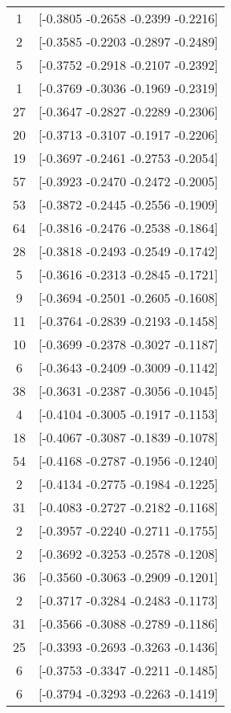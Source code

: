 \documentclass[12pt, fullpage,letterpaper]{article}
\begin{document}
\begin{enumerate}
\begin{enumerate}
{\begin{longtable}{|c|c|}
			  1 &  [-0.3805 -0.2658 -0.2399 -0.2216] \\
			  2 &  [-0.3585 -0.2203 -0.2897 -0.2489] \\
			  5 &  [-0.3752 -0.2918 -0.2107 -0.2392] \\
			  1 &  [-0.3769 -0.3036 -0.1969 -0.2319] \\
			 27 &  [-0.3647 -0.2827 -0.2289 -0.2306] \\
			 20 &  [-0.3713 -0.3107 -0.1917 -0.2206] \\
			 19 &  [-0.3697 -0.2461 -0.2753 -0.2054] \\
			 57 &  [-0.3923 -0.2470 -0.2472 -0.2005] \\
			 53 &  [-0.3872 -0.2445 -0.2556 -0.1909] \\
			 64 &  [-0.3816 -0.2476 -0.2538 -0.1864] \\
			 28 &  [-0.3818 -0.2493 -0.2549 -0.1742] \\
			  5 &  [-0.3616 -0.2313 -0.2845 -0.1721] \\
			  9 &  [-0.3694 -0.2501 -0.2605 -0.1608] \\
			 11 &  [-0.3764 -0.2839 -0.2193 -0.1458] \\
			 10 &  [-0.3699 -0.2378 -0.3027 -0.1187] \\
			  6 &  [-0.3643 -0.2409 -0.3009 -0.1142] \\
			 38 &  [-0.3631 -0.2387 -0.3056 -0.1045] \\
			  4 &  [-0.4104 -0.3005 -0.1917 -0.1153] \\
			 18 &  [-0.4067 -0.3087 -0.1839 -0.1078] \\
			 54 &  [-0.4168 -0.2787 -0.1956 -0.1240] \\
			  2 &  [-0.4134 -0.2775 -0.1984 -0.1225] \\
			 31 &  [-0.4083 -0.2727 -0.2182 -0.1168] \\
			  2 &  [-0.3957 -0.2240 -0.2711 -0.1755] \\
			  2 &  [-0.3692 -0.3253 -0.2578 -0.1208] \\
			 36 &  [-0.3560 -0.3063 -0.2909 -0.1201] \\
			  2 &  [-0.3717 -0.3284 -0.2483 -0.1173] \\
			 31 &  [-0.3566 -0.3088 -0.2789 -0.1186] \\
			 25 &  [-0.3393 -0.2693 -0.3263 -0.1436] \\
			  6 &  [-0.3753 -0.3347 -0.2211 -0.1485] \\
			  6 &  [-0.3794 -0.3293 -0.2263 -0.1419] \\

\end{longtable}}
\end{enumerate}
\end{enumerate}
\end{document}
